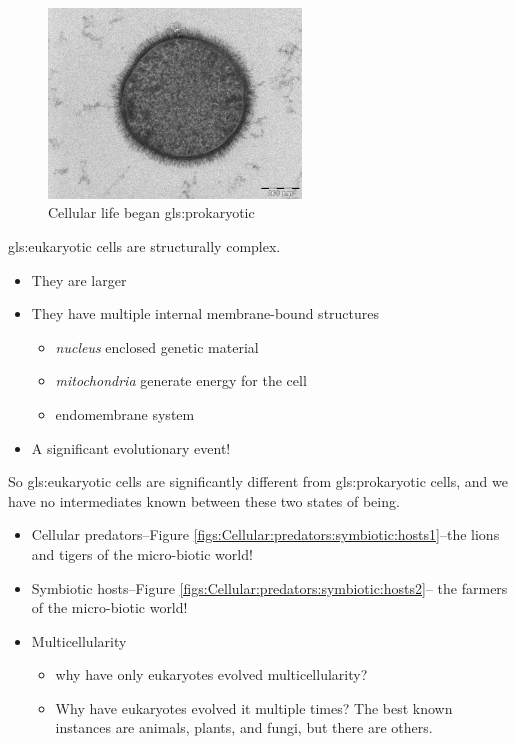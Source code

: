 \documentclass[]{article}
\begin{document}
\begin{figure}[H]
	\begin{center}
		\caption{Cellular life began \gls{gls:prokaryotic}}\label{fig:prokaryote}
		\includegraphics[width=0.6\textwidth]{prokaryote}
	\end{center}
\end{figure}

\Gls{gls:eukaryotic} cells are structurally complex. 

\begin{itemize}
	\item They are larger
	\item They have multiple internal membrane-bound structures
	\begin{itemize}
		\item \emph{nucleus} enclosed genetic material
		\item \emph{mitochondria} generate energy for the cell
		\item endomembrane system
	\end{itemize}
	\item A significant evolutionary event!
\end{itemize}

So \gls{gls:eukaryotic} cells are significantly different from \gls{gls:prokaryotic} cells, and we have no intermediates known between these two states of being.
\begin{itemize}
	\item Cellular predators--Figure \ref{figs:Cellular:predators:symbiotic:hosts1}--the lions and tigers of the micro-biotic world!
	\item Symbiotic hosts--Figure \ref{figs:Cellular:predators:symbiotic:hosts2}-- the farmers of the micro-biotic world!
	\item Multicellularity
	\begin{itemize}
		\item why have only eukaryotes evolved multicellularity?
		\item Why have eukaryotes evolved it multiple times? The best known instances are animals, plants, and fungi, but there are others.
	\end{itemize}
\end{itemize}
\end{document}

